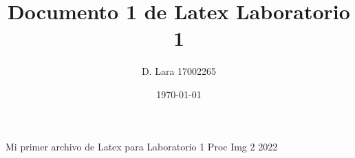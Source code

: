 \documentclass{article}[12pt, letterpaper]
\title{Documento 1 de Latex Laboratorio 1}
\author{D. Lara 17002265}
\date{\today}
\begin{document}
	\maketitle
	Mi primer archivo de Latex para Laboratorio 1 Proc Img 2 2022
\end{document}
